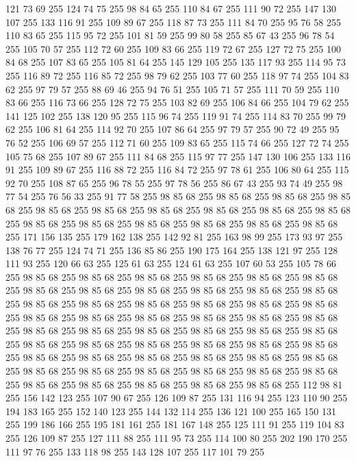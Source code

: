 121 73 69 255 124 74 75 255 98 84 65 255 110 84 67 255 111 90 72 255 147 130 107 255 133 116 91 255 109 89 67 255 118 87 73 255 111 84 70 255 95 76 58 255 110 83 65 255 115 95 72 255 101 81 59 255 99 80 58 255 85 67 43 255 96 78 54 255 105 70 57 255 112 72 60 255 109 83 66 255 119 72 67 255 127 72 75 255 100 84 68 255 107 83 65 255 105 81 64 255 145 129 105 255 135 117 93 255 114 95 73 255 116 89 72 255 116 85 72 255 98 79 62 255 103 77 60 255 118 97 74 255 104 83 62 255 97 79 57 255 88 69 46 255 94 76 51 255 105 71 57 255 111 70 59 255 110 83 66 255 116 73 66 255 128 72 75 255 103 82 69 255 106 84 66 255 104 79 62 255 141 125 102 255 138 120 95 255 115 96 74 255 119 91 74 255 114 83 70 255 99 79 62 255 106 81 64 255 114 92 70 255 107 86 64 255 97 79 57 255 90 72 49 255 95 76 52 255 106 69 57 255 112 71 60 255 109 83 65 255 115 74 66 255 127 72 74 255 105 75 68 255 107 89 67 255
111 84 68 255 115 97 77 255 147 130 106 255 133 116 91 255 109 89 67 255 116 88 72 255 116 84 72 255 97 78 61 255 106 80 64 255 115 92 70 255 108 87 65 255 96 78 55 255 97 78 56 255 86 67 43 255 93 74 49 255 98 77 54 255 76 56 33 255 91 77 58 255 98 85 68 255 98 85 68 255 98 85 68 255 98 85 68 255 98 85 68 255 98 85 68 255 98 85 68 255 98 85 68 255 98 85 68 255 98 85 68 255 98 85 68 255 98 85 68 255 98 85 68 255 98 85 68 255 98 85 68 255 98 85 68 255 171 156 135 255 179 162 138 255 142 92 81 255 163 98 99 255 173 93 97 255 138 76 77 255 124 74 71 255 136 85 86 255 190 175 164 255 138 121 97 255 128 111 93 255 120 66 63 255 125 61 63 255 124 61 63 255 107 60 53 255 105 78 66 255 98 85 68 255 98 85 68 255 98 85 68 255 98 85 68 255 98 85 68 255 98 85 68 255 98 85 68 255 98 85 68 255 98 85 68 255 98 85 68 255 98 85 68 255 98 85 68 255 98 85 68 255 98 85 68 255
98 85 68 255 98 85 68 255 98 85 68 255 98 85 68 255 98 85 68 255 98 85 68 255 98 85 68 255 98 85 68 255 98 85 68 255 98 85 68 255 98 85 68 255 98 85 68 255 98 85 68 255 98 85 68 255 98 85 68 255 98 85 68 255 98 85 68 255 98 85 68 255 98 85 68 255 98 85 68 255 98 85 68 255 98 85 68 255 98 85 68 255 98 85 68 255 98 85 68 255 98 85 68 255 98 85 68 255 98 85 68 255 98 85 68 255 98 85 68 255 98 85 68 255 98 85 68 255 98 85 68 255 98 85 68 255 98 85 68 255 98 85 68 255 98 85 68 255 98 85 68 255 98 85 68 255 112 98 81 255 156 142 123 255 107 90 67 255 126 109 87 255 131 116 94 255 123 110 90 255 194 183 165 255 152 140 123 255 144 132 114 255 136 121 100 255 165 150 131 255 199 186 166 255 195 181 161 255 181 167 148 255 125 111 91 255 119 104 83 255 126 109 87 255 127 111 88 255 111 95 73 255 114 100 80 255 202 190 170 255 111 97 76 255 133 118 98 255 143 128 107 255 117 101 79 255
